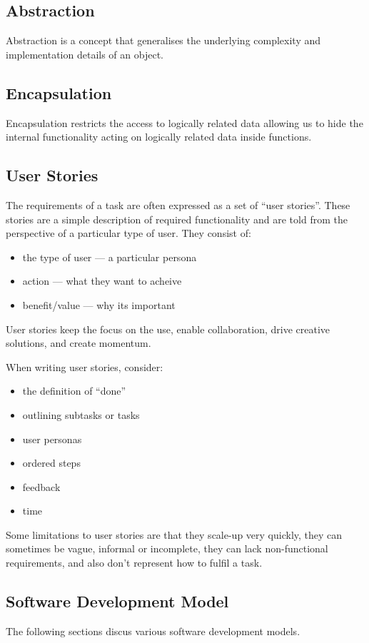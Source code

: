 \documentclass{article}
\begin{document}
\subsection{Abstraction}
Abstraction is a concept that generalises the underlying complexity
and implementation details of an object.
\subsection{Encapsulation}
Encapsulation restricts the access to logically related data
allowing us to hide the internal \linebreak functionality acting on logically
related data inside functions.
\subsection{User Stories}
The requirements of a task are often expressed as a set of ``user stories''. These
stories are a simple description of required functionality and are told from the perspective
of a particular type of user. They consist of:
\begin{itemize}
    \item the type of user --- a particular persona
    \item action --- what they want to acheive
    \item benefit/value --- why its important
\end{itemize}
User stories keep the focus on the use, enable collaboration, drive creative solutions, and create momentum.

When writing user stories, consider:
\begin{itemize}
    \item the definition of ``done''
    \item outlining subtasks or tasks
    \item user personas
    \item ordered steps
    \item feedback
    \item time
\end{itemize}
Some limitations to user stories are that they scale-up very quickly, they can sometimes
be vague, informal or incomplete, they can lack non-functional requirements, and also don't
represent how to fulfil a task.
\subsection{Software Development Model}
The following sections discus various software development models.
\end{document}

